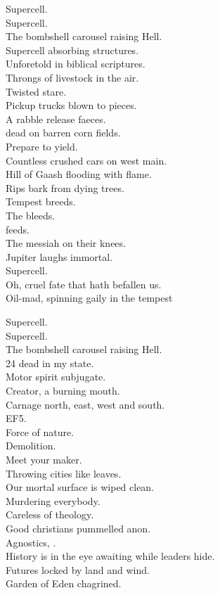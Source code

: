 Supercell. \\
Supercell. \\
The bombshell carousel raising Hell. \\

Supercell absorbing structures. \\
Unforetold in biblical scriptures. \\
Throngs of livestock in the air. \\
Twisted stare. \\
Pickup trucks blown to pieces. \\
A rabble release faeces. \\
 dead on barren corn fields. \\
Prepare to yield. \\
Countless crushed cars on west main. \\
Hill of Gaash flooding with flame. \\
Rips bark from dying trees. \\
Tempest breeds. \\
The  bleeds. \\
 feeds. \\
The messiah on their knees. \\
Jupiter laughs immortal. \\
Supercell. \\

Oh, cruel fate that hath befallen us. \\
Oil-mad, spinning gaily in the tempest\

Supercell. \\
Supercell. \\
The bombshell carousel raising Hell. \\

24 dead in my state. \\
Motor spirit subjugate. \\
Creator, a burning mouth. \\
Carnage north, east, west and south. \\
EF5. \\
Force of nature. \\
Demolition. \\
Meet your maker. \\
Throwing cities like leaves. \\
Our mortal surface is wiped clean. \\

Murdering everybody. \\
Careless of theology. \\
Good christians pummelled anon. \\
Agnostics, . \\
History is in the eye awaiting  while leaders hide. \\
Futures locked by land and wind. \\
Garden of Eden chagrined. \\

